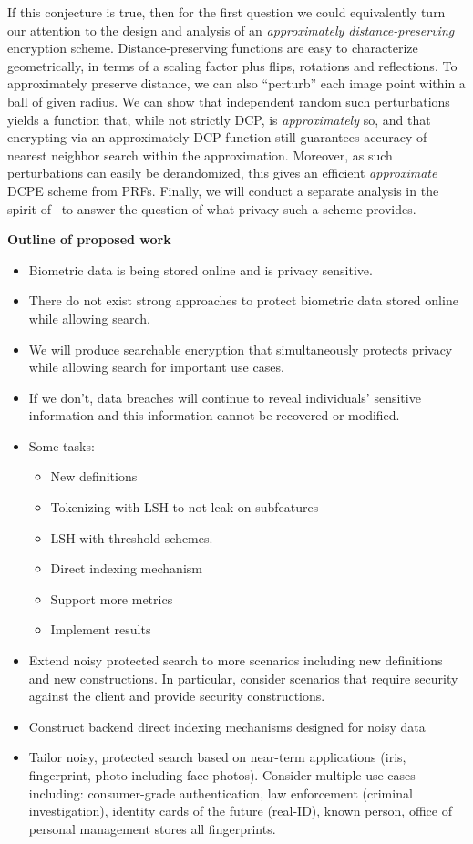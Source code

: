 If this conjecture is true, then for the first question we could equivalently turn our attention to the design and analysis of  an \emph{approximately distance-preserving} encryption scheme. 
Distance-preserving functions are easy to characterize geometrically, in terms of a scaling factor plus flips, rotations and reflections.  To approximately preserve distance, we can also  ``perturb'' each image point within a ball of given radius.  
We can show that independent random such perturbations yields a function that, while not strictly DCP, is \emph{approximately} so, and that encrypting via an approximately DCP function still guarantees accuracy of nearest neighbor  search within the approximation.  Moreover, as such perturbations can easily be derandomized, this gives an efficient \emph{approximate} DCPE scheme from PRFs.  Finally, we will conduct a separate analysis in the spirit of~\cite{C:BolCheOne11} to answer the question of what privacy such a scheme provides.  

\textbf{Outline of proposed work}
\begin{itemize}
\item Biometric data is being stored online and is privacy sensitive.
\item There do not exist strong approaches to protect biometric data stored online while allowing search.
\item We will produce searchable encryption that simultaneously protects privacy while allowing search for important use cases.
\item If we don't, data breaches will continue to reveal individuals' sensitive information and this information cannot be recovered or modified.
\item Some tasks:
\begin{itemize}
\item New definitions
\item Tokenizing with LSH to not leak on subfeatures
\item LSH with threshold schemes.
\item Direct indexing mechanism
\item Support more metrics
\item Implement results
\end{itemize}
\item Extend noisy protected search to more scenarios including new definitions and new constructions.  In particular, consider scenarios that require security against the client and provide security constructions.
\item Construct backend direct indexing mechanisms designed for noisy data
\item Tailor noisy, protected search based on near-term applications (iris, fingerprint, photo including face photos).  Consider multiple use cases including: consumer-grade authentication, law enforcement (criminal investigation), identity cards of the future (real-ID), known person, office of personal management stores all fingerprints.
\end{itemize}


